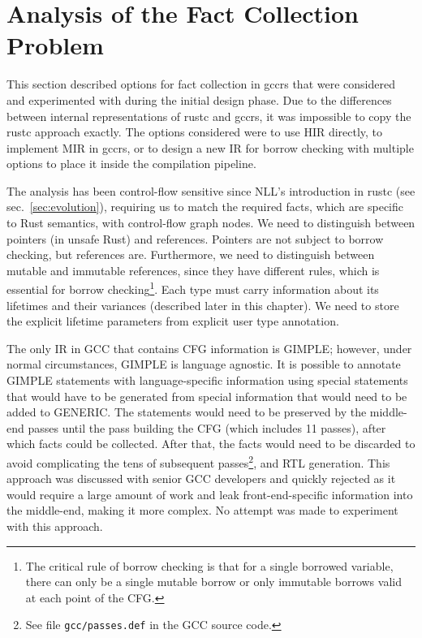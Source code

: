 \documentclass[
  11pt,
  twoside,symmetric]{report}
\begin{document}
\section{Analysis of the Fact Collection
Problem}\label{sec:analysis-of-the-fact-collection-problem}

This section described options for fact collection in gccrs that were
considered and experimented with during the initial design phase. Due to
the differences between internal representations of rustc and gccrs, it
was impossible to copy the rustc approach exactly. The options
considered were to use HIR directly, to implement MIR in gccrs, or to
design a new IR for borrow checking with multiple options to place it
inside the compilation pipeline.

The analysis has been control-flow sensitive since NLL's introduction in
rustc (see sec.~\ref{sec:evolution}), requiring us to match the required
facts, which are specific to Rust semantics, with control-flow graph
nodes. We need to distinguish between pointers (in unsafe Rust) and
references. Pointers are not subject to borrow checking, but references
are. Furthermore, we need to distinguish between mutable and immutable
references, since they have different rules, which is essential for
borrow checking\footnote{The critical rule of borrow checking is that
  for a single borrowed variable, there can only be a single mutable
  borrow or only immutable borrows valid at each point of the CFG.}.
Each type must carry information about its lifetimes and their variances
(described later in this chapter). We need to store the explicit
lifetime parameters from explicit user type annotation.

The only IR in GCC that contains CFG information is GIMPLE; however,
under normal circumstances, GIMPLE is language agnostic. It is possible
to annotate GIMPLE statements with language-specific information using
special statements that would have to be generated from special
information that would need to be added to GENERIC. The statements would
need to be preserved by the middle-end passes until the pass building
the CFG (which includes 11 passes), after which facts could be
collected. After that, the facts would need to be discarded to avoid
complicating the tens of subsequent
passes\footnote{See file \texttt{gcc/passes.def} in the GCC source code.}, and RTL generation. This approach was discussed with senior
GCC developers and quickly rejected as it would require a large amount
of work and leak front-end-specific information into the middle-end,
making it more complex. No attempt was made to experiment with this
approach.
\end{document}
